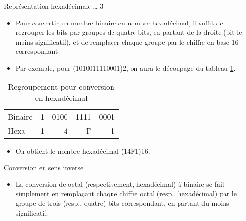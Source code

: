 \documentclass[presentation]{beamer}
\begin{document}
\begin{frame}[label={sec:org5ac7b0c}]{Représentation hexadécimale \ldots{} 3}
\begin{itemize}
\item Pour convertir un nombre binaire en nombre hexadécimal, il suffit de regrouper les bits par groupes de quatre bits, en partant de la droite (bit le moins significatif), et de remplacer chaque groupe par le chiffre en base 16 correspondant

\item Par exemple, pour (1010011110001)2, on aura le découpage du tableau \ref{tab:org41b7deb}.
\end{itemize}

\begin{table}[htbp]
\caption{\label{tab:org41b7deb}Regroupement pour conversion en hexadécimal}
\centering
\begin{tabular}{lrrrr}
 &  &  &  & \\[0pt]
\hline
Binaire & 1 & 0100 & 1111 & 0001\\[0pt]
Hexa & 1 & 4 & F & 1\\[0pt]
\end{tabular}
\end{table}

\begin{itemize}
\item On obtient le nombre hexadécimal (14F1)16.
\end{itemize}
\end{frame}

\begin{frame}[label={sec:org7cdde3b}]{Conversion en sens inverse}
\begin{itemize}
\item La conversion de octal (respectivement, hexadécimal) à binaire se fait simplement en remplaçant chaque chiffre octal (resp., hexadécimal) par le groupe de trois (resp., quatre) bits correspondant, en partant du moins significatif.
\end{itemize}
\end{frame}
\end{document}
